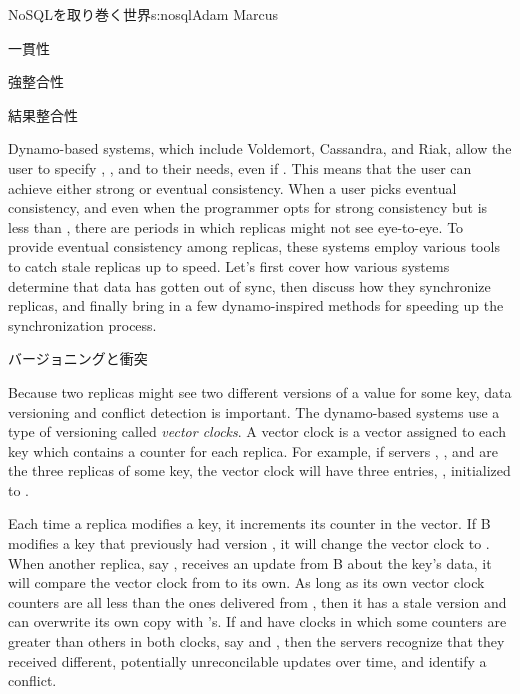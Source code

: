 \begin{aosachapter}{NoSQLを取り巻く世界}{s:nosql}{Adam Marcus}
\begin{aosasect1}{一貫性}
\begin{aosasect2}{強整合性}
\end{aosasect2}

\begin{aosasect2}{結果整合性}

Dynamo-based systems, which include Voldemort, Cassandra, and Riak,
allow the user to specify , , and  to their
needs, even if .  This means that the user
can achieve either strong or eventual consistency.  When a user picks
eventual consistency, and even when the programmer opts for strong
consistency but  is less than , there are periods in
which replicas might not see eye-to-eye.  To provide eventual
consistency among replicas, these systems employ various tools to
catch stale replicas up to speed.  Let's first cover how various
systems determine that data has gotten out of sync, then discuss how
they synchronize replicas, and finally bring in a few dynamo-inspired
methods for speeding up the synchronization process.

\begin{aosasect3}{バージョニングと衝突}

Because two replicas might see two different versions of a value for
some key, data versioning and conflict detection is important.  The
dynamo-based systems use a type of versioning called \emph{vector
clocks}.  A vector clock is a vector assigned to each key which
contains a counter for each replica.  For example, if
servers , , and  are the three replicas of
some key, the vector clock will have three entries, , initialized to .

Each time a replica modifies a key, it increments its counter in the
vector.  If B modifies a key that previously had version , it will change the vector clock to .  When
another replica, say , receives an update from B about the
key's data, it will compare the vector clock from  to its own.
As long as its own vector clock counters are all less than the ones
delivered from , then it has a stale version and can overwrite
its own copy with 's.  If  and  have clocks in
which some counters are greater than others in both clocks, say
 and , then the servers recognize
that they received different, potentially unreconcilable updates over
time, and identify a conflict.


\end{aosasect3}
\end{aosasect2}
\end{aosasect1}
\end{aosachapter}

